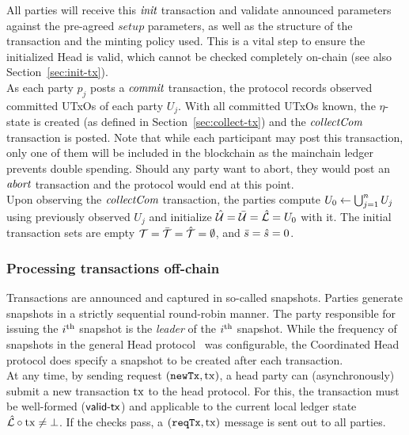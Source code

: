 \quad All parties will receive this $\textit{init}$
transaction and validate announced parameters against the pre-agreed $setup$
parameters, as well as the structure of the transaction and the minting policy
used. This is a vital step to ensure the initialized Head is valid, which
cannot be checked completely on-chain (see also Section~\ref{sec:init-tx}). \\

\quad As each party $p_{j}$ posts a
$\textit{commit}$ transaction, the protocol records observed committed UTxOs of each
party $U_j$. With all committed UTxOs known, the $\eta$-state is created (as
defined in Section~\ref{sec:collect-tx}) and the $\textit{collectCom}$ transaction is
posted. Note that while each participant may post this transaction, only one of
them will be included in the blockchain as the mainchain ledger prevents double
spending. Should any party want to abort, they would post an $\textit{abort}$
transaction and the protocol would end at this point.\\

\quad Upon observing the $\textit{collectCom}$
transaction, the parties compute $U_{0} \gets \bigcup_{j=1}^{n} U_j$ using
previously observed $U_j$ and initialize $\hat {\mathcal U} = \bar {\mathcal U} = \hat {\mathcal L} = U_{0}$
with it. The initial transaction sets are
empty ${\mathcal T} = \bar {\mathcal T} =\hat {\mathcal T} =\emptyset$, and $\bar s = \hat s = 0$.

\subsubsection{Processing transactions off-chain}

Transactions are announced and captured in so-called snapshots. Parties generate
snapshots in a strictly sequential round-robin manner. The party responsible for
issuing the $i^{\text{th}}$ snapshot is the \emph{leader} of the $i^{\text{th}}$ snapshot.
While the frequency of snapshots in the general Head protocol~\cite{hydrahead20}
was configurable, the Coordinated Head protocol does specify a snapshot to be
created after each transaction.\\

\quad At any time, by sending request $(\mathtt{newTx},\mathrm{tx})$, a
head party can (asynchronously) submit a new transaction $\mathrm{tx}$ to the head
protocol. For this, the transaction must be well-formed ($\mathsf{valid\textsf{-}{}tx}$) and applicable to the current local ledger state
$\hat {\mathcal L} \circ \mathrm{tx} \neq \bot$. If the checks
pass, a $(\mathtt{reqTx},\mathrm{tx})$ message is sent out to all parties.\\

